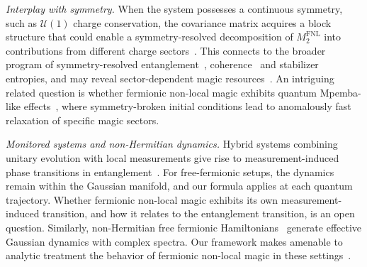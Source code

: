 \documentclass[prx,twocolumn,superscriptaddress,aps,10pt, frontmatterverbose, reprint,footinbib,longbibliography=true]{revtex4-2}
\begin{document}
\emph{Interplay with symmetry.}
When the system possesses a continuous symmetry, such as $\mathcal{U}(1)$ charge conservation, the covariance matrix acquires a block structure that could enable a symmetry-resolved decomposition of $M_2^{\mathrm{FNL}}$ into contributions from different charge sectors~\cite{Goldstein}.
This connects to the broader program of symmetry-resolved entanglement~\cite{Bianchi_2022}, coherence~\cite{aditya2026coherencedynamicsquantummanybody} and stabilizer entropies, and may reveal sector-dependent magic resources~\cite{iannotti2026nonstabilizernessu1symmetrychaotic, cepollaro2025stabilizerentropysubspaces, Esposito_2024}.
An intriguing related question is whether fermionic non-local magic exhibits quantum Mpemba-like effects~\cite{Ares_2023,Ares_2025,aditya2025mpembaeffectsquantumcomplexity}, where symmetry-broken initial conditions lead to anomalously fast relaxation of specific magic sectors.

\emph{Monitored systems and non-Hermitian dynamics.}
Hybrid systems combining unitary evolution with local measurements give rise to measurement-induced phase transitions in entanglement~\cite{FisherRandom2023,Li_2025,oshima}.
For free-fermionic setups, the dynamics remain within the Gaussian manifold, and our formula applies at each quantum trajectory.
Whether fermionic non-local magic exhibits its own measurement-induced transition, and how it relates to the entanglement transition, is an open question.
Similarly, non-Hermitian free fermionic Hamiltonians~\cite{Ashida_2020,kawabata2026nonhermitiandisorderedsystems} generate effective Gaussian dynamics with complex spectra.
Our framework makes amenable to analytic treatment the behavior of fermionic non-local magic in these settings~\cite{schirooooo,gallo,granet,lapierre2025entanglementtransitionsstructuredrandom}.
\end{document}
